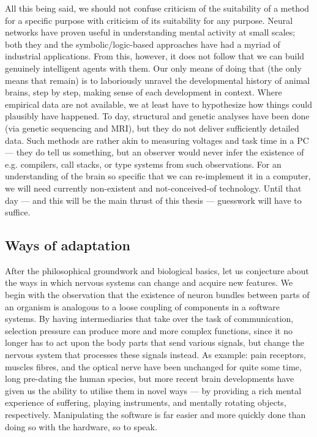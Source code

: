 All this being said, we should not confuse criticism of the suitability of a method for a specific purpose with criticism of its suitability for any purpose. Neural networks have proven useful in understanding mental activity at small scales; both they and the symbolic/logic-based approaches have had a myriad of industrial applications. From this, however, it does not follow that we can build genuinely intelligent agents with them. Our only means of doing that (the only means that remain) is to laboriously unravel the developmental history of animal brains, step by step, making sense of each development in context. Where empirical data are not available, we at least have to hypothesize how things could plausibly have happened. To day, structural and genetic analyses have been done (via genetic sequencing and MRI), but they do not deliver sufficiently detailed data. Such methods are rather akin to measuring voltages and task time in a PC --- they do tell us something, but an observer would never infer the existence of e.g. compilers, call stacks, or type systems from such observations. For an understanding of the brain so specific that we can re-implement it in a computer, we will need currently non-existent and not-conceived-of technology. Until that day --- and this will be the main thrust of this thesis --- guesswork will have to suffice.

\subsection{Ways of adaptation}

After the philosophical groundwork and biological basics, let us conjecture about the ways in which nervous systems can change and acquire new features. We begin with the observation that the existence of neuron bundles between parts of an organism is analogous to a loose coupling of components in a software systems. By having intermediaries that take over the task of communication, selection pressure can produce more and more complex functions, since it no longer has to act upon the body parts that send various signals, but change the nervous system that processes these signals instead. As example: pain receptors, muscles fibres, and the optical nerve have been unchanged for quite some time, long pre-dating the human species, but more recent brain developments have given us the ability to utilise them in novel ways --- by providing a rich mental experience of suffering, playing instruments, and mentally rotating objects, respectively. Manipulating the software is far easier and more quickly done than doing so with the hardware, so to speak.

